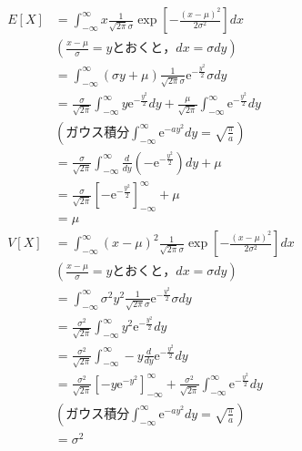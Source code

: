 %
\begin{align*}
	E[X] 
	&= \int_{-\infty}^{\infty} x \frac{1}{\sqrt{2\pi} \sigma} \exp \left[ - \frac{(x-\mu)^{2}}{2\sigma^{2}} \right] dx \\
	&\left( \frac{x-\mu}{\sigma} = yとおくと，dx = \sigma dy \right)\\
	&= \int_{-\infty}^{\infty} (\sigma y + \mu) \frac{1}{\sqrt{2\pi}\sigma} \mathrm{e}^{-\frac{y^{2}}{2}} \sigma dy \\
	&= \frac{\sigma}{\sqrt{2\pi}} \int_{-\infty}^{\infty} y \mathrm{e}^{-\frac{y^{2}}{2}} dy + \frac{\mu}{\sqrt{2\pi}} \int_{-\infty}^{\infty} \mathrm{e}^{-\frac{y^{2}}{2}} dy \\
	&\left(ガウス積分 \int_{-\infty}^{\infty} \mathrm{e}^{-ay^{2}} dy = \sqrt{\frac{\pi}{a}} \right) \\
	&= \frac{\sigma}{\sqrt{2\pi}} \int_{-\infty}^{\infty} \frac{d }{d y} \left( - \mathrm{e}^{-\frac{y^{2}}{2}} \right) dy + \mu \\
	&= \frac{\sigma}{\sqrt{2\pi}}\left[- \mathrm{e}^{-\frac{y^{2}}{2}} \right]_{-\infty}^{\infty} + \mu \\
	&= \mu \\
	V[X]
	&= \int_{-\infty}^{\infty} (x-\mu)^{2} \frac{1}{\sqrt{2\pi} \sigma} \exp \left[ - \frac{(x-\mu)^{2}}{2\sigma^{2}} \right] dx \\
	&\left( \frac{x-\mu}{\sigma} = yとおくと，dx = \sigma dy \right)\\
	&= \int_{-\infty}^{\infty} \sigma^{2} y^{2} \frac{1}{\sqrt{2\pi} \sigma} \mathrm{e}^{-\frac{y^{2}}{2}} \sigma dy \\
	&= \frac{\sigma^{2}}{\sqrt{2\pi}} \int_{-\infty}^{\infty} y^{2} \mathrm{e}^{-\frac{y^{2}}{2}} dy\\
	&= \frac{\sigma^{2}}{\sqrt{2\pi}} \int_{-\infty}^{\infty} -y \frac{d }{d y}\mathrm{e}^{-\frac{y^{2}}{2}} dy\\
	&= \frac{\sigma^{2}}{\sqrt{2\pi}}\left[-y \mathrm{e}^{-y^{2}} \right]_{-\infty}^{\infty} + \frac{\sigma^{2}}{\sqrt{2\pi}}\int_{-\infty}^{\infty} \mathrm{e}^{-\frac{y^{2}}{2}} dy\\
	&\left(ガウス積分 \int_{-\infty}^{\infty} \mathrm{e}^{-ay^{2}} dy = \sqrt{\frac{\pi}{a}} \right) \\
	&= \sigma^{2}
\end{align*}
%

%
\clearpage
